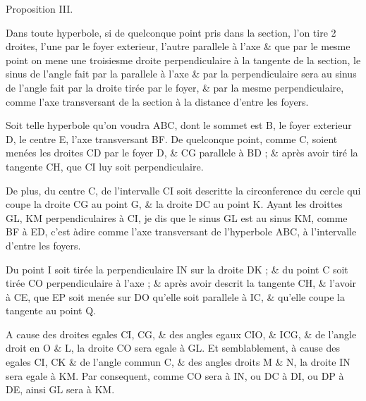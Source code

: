 \documentclass[11pt,a4paper]{article}
\begin{document}
Proposition III.

Dans toute hyperbole, si de quelconque point pris dans la section, l'on tire 2 droites, l'une par le foyer exterieur, l'autre parallele à l'axe \& que par le mesme point on mene une troisiesme droite perpendiculaire à la tangente de la section, le sinus de l'angle fait par la parallele à l'axe \& par la perpendiculaire sera au sinus de l'angle fait par la droite tirée par le foyer, \& par la mesme perpendiculaire, comme l'axe transversant de la section à la distance d'entre les foyers.

Soit telle hyperbole qu'on voudra ABC, dont le sommet est B, le foyer exterieur D, le centre E, l'axe transversant BF. De quelconque point, comme C, soient menées les droites CD par le foyer D, \& CG parallele à BD ; \& après avoir tiré la tangente CH, que CI luy soit perpendiculaire.


 De plus, du centre C, de l'intervalle CI soit descritte la circonference du cercle qui coupe la droite CG au point G, \& la droite DC au point K. Ayant \struck{\ill{}}  les droittes GL, KM perpendiculaires à CI, je dis que le sinus GL est au sinus KM, comme BF à ED, c'est àdire comme l'axe transversant de l'hyperbole ABC, à l'intervalle d'entre les foyers.

Du point I soit tirée la perpendiculaire IN sur la droite DK ; \& du point C soit tirée CO perpendiculaire à l'axe ; \& après avoir descrit la tangente CH, \& l'avoir  à CE, que EP soit menée sur DO  qu'elle soit parallele à IC, \& qu'elle coupe la tangente au point Q.

A cause des droites egales CI, CG, \& des angles egaux CIO, \& ICG, \& de l'angle droit en O \& L, la droite CO sera egale à GL. Et semblablement, à cause des egales CI, CK \& de l'angle commun C, \& des angles droits M \& N, la droite IN sera egale à KM.  Par consequent, comme CO sera à IN, ou DC à DI, ou DP à DE, ainsi GL sera à KM.
\end{document}
